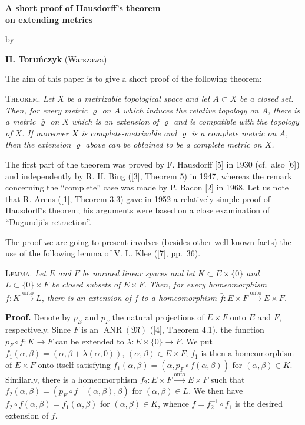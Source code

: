 \documentclass[11pt,a4paper,twoside]{article}
\newcommand{\onto}{\xrightarrow{\mathrm{onto}}}
\begin{document}
\setcounter{page}{191}\thispagestyle{plain}
\begin{center}
{\Large\bfseries A short proof of Hausdorff's theorem\\on extending metrics}\par\bigskip
by\par\medskip
\textbf{H. Toruńczyk} (Warszawa)
\end{center}
\medskip
The aim of this paper is to give a short proof of the following theorem:

\textsc{Theorem.} \textit{Let $X$ be a metrizable topological space and let $A\subset X$ be a closed set. Then, for every metric $\varrho$ on $A$ which induces the relative topology on $A$, there is a metric $\bar\varrho$ on $X$ which is an extension of $\varrho$ and is compatible with the topology of $X$. If moreover $X$ is complete-metrizable and $\varrho$ is a complete metric on $A$, then the extension $\bar\varrho$ above can be obtained to be a complete metric on $X$.}

The first part of the theorem was proved by F. Hausdorff [5] in 1930 (cf.\ also [6]) and independently by R. H. Bing ([3], Theorem 5) in 1947, whereas the remark concerning the ``complete'' case was made by P. Bacon [2] in 1968. Let us note that R. Arens ([1], Theorem 3.3) gave in 1952 a relatively simple proof of Hausdorff's theorem; his arguments were based on a close examination of ``Dugundji's retraction''.

The proof we are going to present involves (besides other well-known facts) the use of the following lemma of V. L. Klee ([7], pp.\ 36).

\textsc{Lemma.} \textit{Let $E$ and $F$ be normed linear spaces and let $K\subset E\times\{0\}$ and $L\subset\{0\}\times F$ be closed subsets of $E\times F$. Then, for every homeomorphism $f\colon K\onto L$, there is an extension of $f$ to a homeomorphism $\bar f\colon E\times F\onto E\times F$.}

\textbf{Proof.} Denote by $p_E$ and $p_F$ the natural projections of $E\times F$ onto $E$ and $F$, respectively. Since $F$ is an $\operatorname{ANR}(\mathfrak M)$ ([4], Theorem 4.1), the function $p_F\circ f\colon K\to F$ can be extended to $\lambda\colon E\times\{0\}\to F$. We put $f_1(\alpha,\beta)=(\alpha,\beta+\lambda(\alpha,0))$, $(\alpha,\beta)\in E\times F$; $f_1$ is then a homeomorphism of $E\times F$ onto itself satisfying $f_1(\alpha,\beta)=(\alpha,p_F\circ f(\alpha,\beta))$ for $(\alpha,\beta)\in K$. Similarly, there is a homeomorphism $f_2\colon E\times F\onto E\times F$ such that $f_2(\alpha,\beta)=(p_E\circ f^{-1}(\alpha,\beta),\beta)$ for $(\alpha,\beta)\in L$. We then have $f_2\circ f(\alpha,\beta)=f_1(\alpha,\beta)$ for $(\alpha,\beta)\in K$, whence $\bar f=f_2^{-1}\circ f_1$ is the desired extension of $f$.
\end{document}
